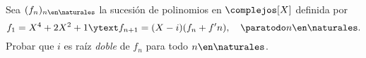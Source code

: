 \begin{enunciado}{\ejercicio}
	Sea $(f_n)_{n\en \naturales}$ la sucesión de polinomios en $\complejos[X]$ definida por
	$$
		f_1 = X^4 + 2X^2 + 1 \ytext f_{n+1} = (X - i)(f_n + f'n), \quad \paratodo n \en \naturales.
	$$
	Probar que $i$ es raíz \textit{doble} de $f_n$ para todo $n \en \naturales$.
\end{enunciado}
\hacer
